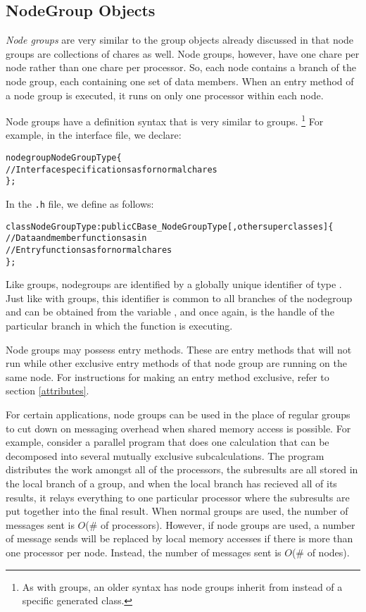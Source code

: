 \subsection{NodeGroup Objects}

{\it Node groups}    are very
similar to the group objects already discussed in that node groups are
collections of chares as well.  Node groups, however, have one chare per node
rather than one chare per processor.  So, each node contains a branch of the
node group, each containing one set of data members.  When an entry method of a
node group is executed, it runs on only one processor within each node.

Node groups have a definition syntax that is very similar to groups.  
\footnote{As with groups, an older syntax has node groups inherit from  instead of a specific generated class.}
For example, in the interface file, we declare:

\begin{alltt}
 nodegroup NodeGroupType \{
  // Interface specifications as for normal chares
 \};
\end{alltt}

In the {\tt .h} file, we define  as follows:

\begin{alltt}
 class NodeGroupType : public CBase_NodeGroupType [,other superclasses ] \{
  // Data and member functions as in \CC{}
  // Entry functions as for normal chares
 \};
\end{alltt}

Like groups, nodegroups are identified by a globally unique identifier of type
.  Just like with groups, this identifier is
common to all branches of the nodegroup and can be obtained from the variable
, and once again, 
 is the handle of the particular branch in which the function is
executing.

Node groups may possess  entry methods.  These
are entry methods that will not run while other exclusive entry methods
of that node group are running on the same node.  For instructions for making
an entry method exclusive, refer to section \ref{attributes}.

For certain applications, node groups can be used in the place of regular
groups to cut down on messaging overhead when shared memory access is possible.
For example, consider a parallel program that does one calculation that can be
decomposed into several mutually exclusive subcalculations.  The program
distributes the work amongst all of the processors, the subresults are all
stored in the local branch of a group, and when the local branch has recieved
all of its results, it relays everything to one particular processor where the
subresults are put together into the final result.  When normal groups are
used, the number of messages sent is $O$(\# of processors).  However, if node
groups are used, a number of message sends will be replaced by local memory
accesses if there is more than one processor per node.  Instead, the number of
messages sent is $O$(\# of nodes).


